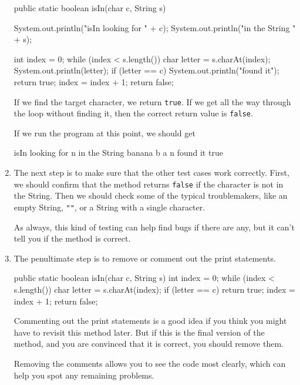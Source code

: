 \documentclass{book}
\begin{document}
\begin{enumerate}
\begin{verbatimtab}
public static boolean isIn(char c, String s) {
    System.out.println("isIn looking for " + c);
    System.out.println("in the String " + s);

    int index = 0;
    while (index < s.length()) {
        char letter = s.charAt(index);
        System.out.println(letter);
        if (letter == c) {
            System.out.println("found it");
            return true;
        }
        index = index + 1;
    }
    return false;
}
\end{verbatimtab}

If we find the target character, we return {\tt true}.
If we get all the way through the loop without finding it, then
the correct return value is {\tt false}.

If we run the program at this point, we should get

\begin{verbatimtab}
isIn looking for n
in the String banana
b
a
n
found it
true
\end{verbatimtab}


\item The next step is to make sure that the other test cases
work correctly.  First, we should confirm that the method returns
{\tt false} if the character is not in the String.
Then we should check some of the typical troublemakers, like
an empty String, {\tt ""}, or a String with a single character.

As always, this kind of testing can help find bugs if there
are any, but it can't tell you if the method is correct.

\item The penultimate step is to remove or comment out the print
statements.

\begin{verbatimtab}
public static boolean isIn(char c, String s) {
    int index = 0;
    while (index < s.length()) {
        char letter = s.charAt(index);
        if (letter == c) {
	    return true;
        }
        index = index + 1;
    }
    return false;
}
\end{verbatimtab}

Commenting out the print statements is a good idea if you
think you might have to revisit this method later.  But if
this is the final version of the method, and you are convinced
that it is correct, you should remove them.

Removing the comments allows you to see the code most clearly,
which can help you spot any remaining problems.


\end{enumerate}
\end{document}
